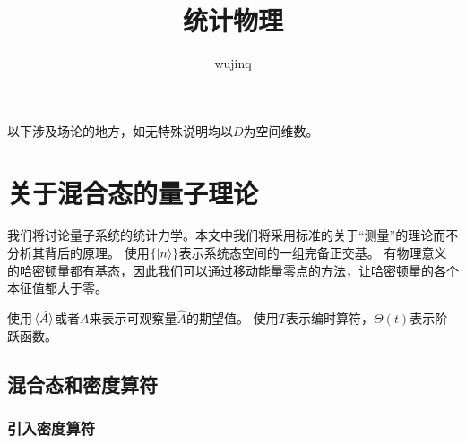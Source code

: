 \documentclass[hyperref, UTF8, a4paper]{ctexart}
\title{统计物理}
\author{wujinq}
\begin{document}
\maketitle

以下涉及场论的地方，如无特殊说明均以$D$为空间维数。

\section{关于混合态的量子理论}

我们将讨论量子系统的统计力学。本文中我们将采用标准的关于“测量”的理论而不分析其背后的原理。
使用$\{\ket{n}\}$表示系统态空间的一组完备正交基。
有物理意义的哈密顿量都有基态，因此我们可以通过移动能量零点的方法，让哈密顿量的各个本征值都大于零。

使用$\expval*{\hat{A}}$或者$\bar{A}$来表示可观察量$\hat{A}$的期望值。
使用$T$表示编时算符，$\Theta(t)$表示阶跃函数。

\subsection{混合态和密度算符}

\subsubsection{引入密度算符}\label{sec:introduction-of-density-operator}
\end{document}
